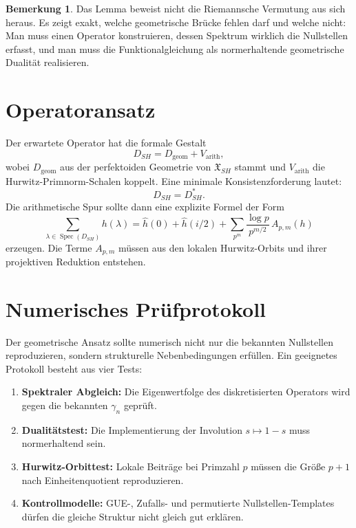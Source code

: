 \documentclass[11pt,a4paper,reqno]{amsart}
\theoremstyle{definition}
\newtheorem{remark}[theorem]{Bemerkung}
\numberwithin{equation}{section}
\begin{document}
\begin{remark}
Das Lemma beweist nicht die Riemannsche Vermutung aus sich heraus. Es zeigt exakt, welche geometrische Brücke fehlen darf und welche nicht: Man muss einen Operator konstruieren, dessen Spektrum wirklich die Nullstellen erfasst, und man muss die Funktionalgleichung als normerhaltende geometrische Dualität realisieren.
\end{remark}

\section{Operatoransatz}

Der erwartete Operator hat die formale Gestalt
\begin{equation}
  D_{SH}=D_{\mathrm{geom}}+V_{\mathrm{arith}},
\end{equation}
wobei \(D_{\mathrm{geom}}\) aus der perfektoiden Geometrie von \(\mathfrak{X}_{SH}\) stammt und \(V_{\mathrm{arith}}\) die Hurwitz-Primnorm-Schalen koppelt. Eine minimale Konsistenzforderung lautet:
\begin{equation}
  D_{SH}=D_{SH}^{*}.
\end{equation}
Die arithmetische Spur sollte dann eine explizite Formel der Form
\begin{equation}
  \sum_{\lambda\in\operatorname{Spec}(D_{SH})}h(\lambda)
  =
  \widehat{h}(0)+\widehat{h}(i/2)+
  \sum_{p^m}\frac{\log p}{p^{m/2}}\,A_{p,m}(h)
\end{equation}
erzeugen. Die Terme \(A_{p,m}\) müssen aus den lokalen Hurwitz-Orbits und ihrer projektiven Reduktion entstehen.

\section{Numerisches Prüfprotokoll}

Der geometrische Ansatz sollte numerisch nicht nur die bekannten Nullstellen reproduzieren, sondern strukturelle Nebenbedingungen erfüllen. Ein geeignetes Protokoll besteht aus vier Tests:

\begin{enumerate}
  \item \textbf{Spektraler Abgleich:} Die Eigenwertfolge des diskretisierten Operators wird gegen die bekannten \(\gamma_n\) geprüft.
  \item \textbf{Dualitätstest:} Die Implementierung der Involution \(s\mapsto 1-s\) muss normerhaltend sein.
  \item \textbf{Hurwitz-Orbittest:} Lokale Beiträge bei Primzahl \(p\) müssen die Größe \(p+1\) nach Einheitenquotient reproduzieren.
  \item \textbf{Kontrollmodelle:} GUE-, Zufalls- und permutierte Nullstellen-Templates dürfen die gleiche Struktur nicht gleich gut erklären.
\end{enumerate}
\end{document}
